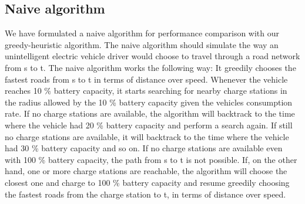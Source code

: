 \subsection{Naive algorithm}
\label{sub:naivealgorithm}
We have formulated a naive algorithm for performance comparison with our greedy-heuristic algorithm. The naive algorithm should simulate the way an unintelligent electric vehicle driver would choose to travel through a road network from s to t. The naive algorithm works the following way: It greedily chooses the fastest roads from s to t in terms of distance over speed. Whenever the vehicle reaches 10 \% battery capacity, it starts searching for nearby charge stations in the radius allowed by the 10 \% battery capacity given the vehicles consumption rate. If no charge stations are available, the algorithm will backtrack to the time where the vehicle had 20 \% battery capacity and perform a search again. If still no charge stations are available, it will backtrack to the time where the vehicle had 30 \% battery capacity and so on. If no charge stations are available even with 100 \% battery capacity, the path from s to t is not possible. If, on the other hand, one or more charge stations are reachable, the algorithm will choose the closest one and charge to 100 \% battery capacity and resume greedily choosing the fastest roads from the charge station to t, in terms of distance over speed.



